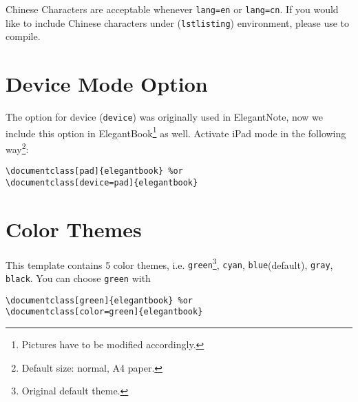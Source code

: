 \documentclass[11pt]{elegantbook}
\begin{document}
\begin{remark}
Chinese Characters  are acceptable whenever \lstinline{lang=en} or \lstinline{lang=cn}. If you would like to include Chinese characters under (\lstinline{lstlisting}) environment, please use  to compile.
\end{remark}

\section{Device Mode Option}
The option for device (\lstinline{device}) was originally used in ElegantNote, now we include this option in ElegantBook\footnote{Pictures have to be modified accordingly.} as well. Activate iPad mode in the following way\footnote{Default size: normal, A4 paper.}:
\begin{lstlisting}
\documentclass[pad]{elegantbook} %or
\documentclass[device=pad]{elegantbook}
\end{lstlisting}

\section{Color Themes}
This template contains 5 color themes, i.e. \textcolor{structure1}{\lstinline{green}}\footnote{Original default theme.}, \textcolor{structure2}{\lstinline{cyan}}, \textcolor{structure3}{\lstinline{blue}}(default), \textcolor{structure4}{\lstinline{gray}}, \textcolor{structure5}{\lstinline{black}}. You can choose \lstinline{green} with
\begin{lstlisting}
\documentclass[green]{elegantbook} %or
\documentclass[color=green]{elegantbook}
\end{lstlisting}
\end{document}

